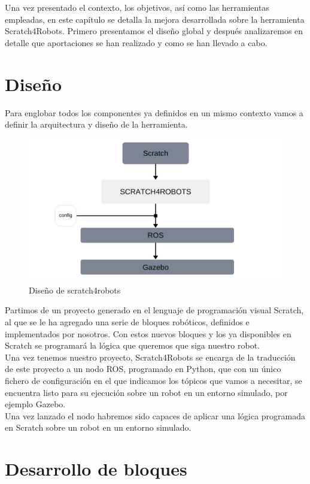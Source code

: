 Una vez presentado el contexto, los objetivos, así como las herramientas empleadas, en este capítulo se detalla la mejora desarrollada sobre la herramienta Scratch4Robots. Primero presentamos el diseño global y después analizaremos en detalle que aportaciones se han realizado y como se han llevado a cabo.
\section{Diseño}
\label{sec:diseno}
Para englobar todos los componentes ya definidos en un mismo contexto vamos a definir la arquitectura y diseño de la herramienta.
\begin{figure}[H]
    \centering
    \includegraphics[scale=0.30]{img/diseno.jpg}
  	\caption{Diseño de scratch4robots}
  	\label{fig:s4r}
\end{figure}
Partimos de un proyecto generado en el lenguaje de programación visual Scratch, al que se le ha agregado una serie de bloques robóticos, definidos e implementados por nosotros. Con estos nuevos bloques y los ya disponibles en Scratch se programará la lógica que queremos que siga nuestro robot.\\

Una vez tenemos nuestro proyecto, Scratch4Robots se encarga de la traducción de este proyecto a un nodo ROS, programado en Python, que con un único fichero de configuración en el que indicamos los tópicos que vamos a necesitar, se encuentra listo para su ejecución sobre un robot en un entorno simulado, por ejemplo Gazebo.\\

Una vez lanzado el nodo habremos sido capaces de aplicar una lógica programada en Scratch sobre un robot en un entorno simulado.


\section{Desarrollo de bloques}
\label{sec:desarrollo-de-bloques}


